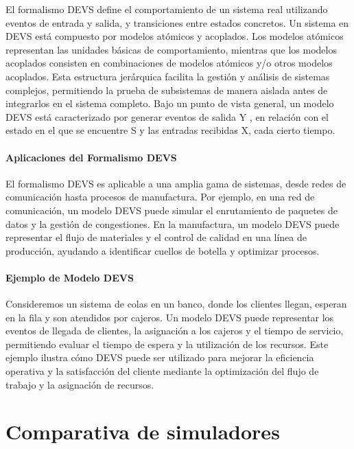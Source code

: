\documentclass[12pt,twoside]{templates/unerthesis}
\begin{document}
El formalismo DEVS define el comportamiento de un sistema real utilizando eventos de entrada y salida, y transiciones entre estados concretos. Un sistema en DEVS está compuesto por modelos atómicos y acoplados. Los modelos atómicos representan las unidades básicas de comportamiento, mientras que los modelos acoplados consisten en combinaciones de modelos atómicos y/o otros modelos acoplados. Esta estructura jerárquica facilita la gestión y análisis de sistemas complejos, permitiendo la prueba de subsistemas de manera aislada antes de integrarlos en el sistema completo.
Bajo un punto de vista general, un modelo DEVS está caracterizado por generar eventos de salida Y , en relación con el estado en el que se encuentre S y las entradas recibidas X, cada cierto tiempo.

\hypertarget{aplicaciones-del-formalismo-devs}{%
\subsubsection{Aplicaciones del Formalismo DEVS}\label{aplicaciones-del-formalismo-devs}}

El formalismo DEVS es aplicable a una amplia gama de sistemas, desde redes de comunicación hasta procesos de manufactura. Por ejemplo, en una red de comunicación, un modelo DEVS puede simular el enrutamiento de paquetes de datos y la gestión de congestiones. En la manufactura, un modelo DEVS puede representar el flujo de materiales y el control de calidad en una línea de producción, ayudando a identificar cuellos de botella y optimizar procesos.

\hypertarget{ejemplo-de-modelo-devs}{%
\subsubsection{Ejemplo de Modelo DEVS}\label{ejemplo-de-modelo-devs}}

Consideremos un sistema de colas en un banco, donde los clientes llegan, esperan en la fila y son atendidos por cajeros. Un modelo DEVS puede representar los eventos de llegada de clientes, la asignación a los cajeros y el tiempo de servicio, permitiendo evaluar el tiempo de espera y la utilización de los recursos. Este ejemplo ilustra cómo DEVS puede ser utilizado para mejorar la eficiencia operativa y la satisfacción del cliente mediante la optimización del flujo de trabajo y la asignación de recursos.

\hypertarget{comparativa-de-simuladores}{%
\chapter{Comparativa de simuladores}\label{comparativa-de-simuladores}}
\end{document}
